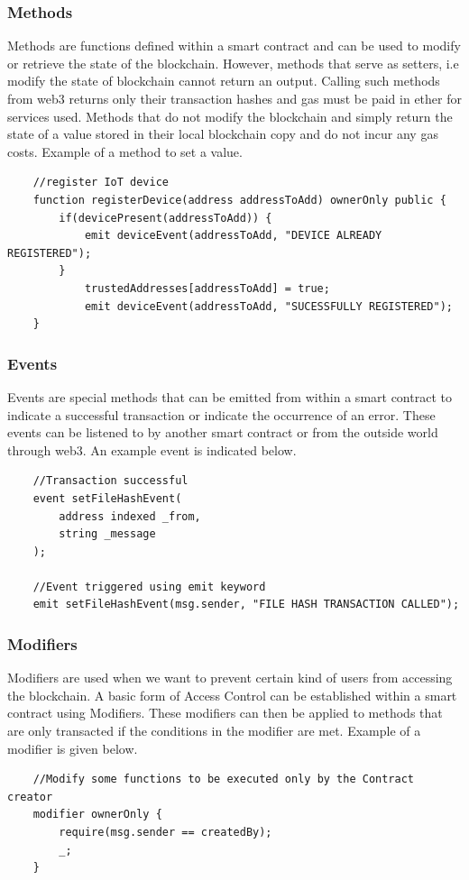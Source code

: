 \documentclass[11pt,openright]{report}
\begin{document}
\subsubsection{Methods}
Methods are functions defined within a smart contract and can be used to modify or retrieve the state of the blockchain. However, methods that serve as setters, i.e modify the state of blockchain cannot return an output. Calling such methods from web3 returns only their transaction hashes and gas must be paid in ether for services used. Methods that do not modify the blockchain and simply return the state of a value stored in their local blockchain copy and do not incur any gas costs. Example of a method to set a value.
\begin{verbatim}
    //register IoT device
    function registerDevice(address addressToAdd) ownerOnly public {
        if(devicePresent(addressToAdd)) {
            emit deviceEvent(addressToAdd, "DEVICE ALREADY REGISTERED");
        }
            trustedAddresses[addressToAdd] = true;
            emit deviceEvent(addressToAdd, "SUCESSFULLY REGISTERED");
    }
\end{verbatim}


\subsubsection{Events}
Events are special methods that can be emitted from within a smart contract to indicate a successful transaction or indicate the occurrence of an error. These events can be listened to by another smart contract or from the outside world through web3. An example event is indicated below.
\begin{verbatim}
    //Transaction successful
    event setFileHashEvent(
        address indexed _from,
        string _message
    );
    
    //Event triggered using emit keyword
    emit setFileHashEvent(msg.sender, "FILE HASH TRANSACTION CALLED");
\end{verbatim}


\subsubsection{Modifiers}
Modifiers are used when we want to prevent certain kind of users from accessing the blockchain. A basic form of Access Control can be established within a smart contract using Modifiers. These modifiers can then be applied to methods that are only transacted if the conditions in the modifier are met. Example of a modifier is given below.
\begin{verbatim}
    //Modify some functions to be executed only by the Contract creator
    modifier ownerOnly {
        require(msg.sender == createdBy);
        _;
    }
\end{verbatim}
\end{document}
